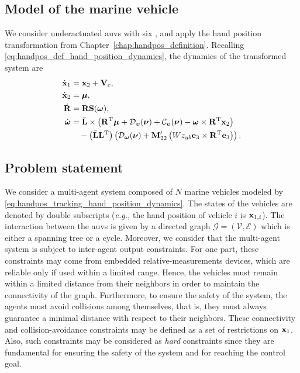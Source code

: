 \subsection{Model of the marine vehicle}

We consider underactuated \glspl{auv} with six , and apply the hand position transformation from Chapter~\ref{chap:handpos_definition}.
Recalling \eqref{eq:handpos_def_hand_position_dynamics}, the dynamics of the transformed system are
\begin{subequations}
    \begin{align}
        \dot{\mathbf{x}}_1 &= \mathbf{x}_2 + \mathbf{V}_c, \label{eq:handpos_tracking_x_1_dot_transformed}\\
        \dot{\mathbf{x}}_2 &= \bm{\mu}, \label{eq:handpos_tracking_x_2_dot_transformed}\\
        \dot{\mathbf{R}} &= \mathbf{R}\mathbf{S}(\bm{\omega}), \label{eq:handpos_tracking_R_dot_CL} \\
        \dot{\bm{\omega}} &= \Bar{\mathbf{L}} \times \left(\mathbf{R}^{\mathrm{T}}\bm{\mu} + \mathcal{D}_{\bm{\upsilon}}(\bm{\nu}) + \mathcal{C}_{\bm{\upsilon}}(\bm{\nu}) - \bm{\omega} \times \mathbf{R}^{\mathrm{T}} \mathbf{x}_2\right) \label{eq:handpos_tracking_omega_dot_CL} \\
            & \quad - \left(\Bar{\mathbf{L}}\mathbf{L}^{\mathrm{T}}\right) \left(\mathcal{D}_{\bm{\omega}}(\bm{\nu}) + \mathbf{M}_{22}^{\prime}\left(Wz_{gb} \mathbf{e}_3 \times \mathbf{R}^{\mathrm{T}} \mathbf{e}_3\right)\right). \nonumber
    \end{align} \label{eq:handpos_tracking_hand_position_dynamics}
\end{subequations}

\subsection{Problem statement}

We consider a multi-agent system composed of $N$ marine vehicles modeled by \eqref{eq:handpos_tracking_hand_position_dynamics}.
The states of the vehicles are denoted by double subscripts (\emph{e.g.,} the hand position of vehicle $i$ is $\mathbf{x}_{1, i}$).
The interaction between the \glspl{auv} is given by a directed graph $\mathcal{G}=(\mathcal{V},\mathcal{E})$ which is either a spanning tree or a cycle.
Moreover, we consider that the multi-agent system is subject to inter-agent output constraints.
For one part, these constraints may come from embedded relative-measurements devices, which are reliable only if used within a limited range. Hence, the vehicles must remain within a limited distance from their neighbors in order to maintain the connectivity of the graph.
Furthermore, to ensure the safety of the system, the agents must avoid collisions among themselves, that is, they must always guarantee a minimal distance with respect to their neighbors.
These connectivity and collision-avoidance constraints may be defined as a set of restrictions on $\mathbf{x}_1$. Also, such constraints may be considered as \emph{hard} constraints since they are fundamental for ensuring the safety of the system and for reaching the control goal.

